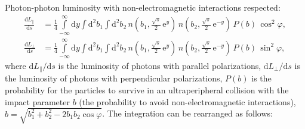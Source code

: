\documentclass[a4paper,12pt]{article}
\begin{document}
Photon-photon luminosity with non-electromagnetic interactions respected:
\begin{equation}
  \begin{aligned}
    \frac{\mathrm{d} L_\parallel}{\mathrm{d} s}
    &= \frac14
       \int\limits_{-\infty}^\infty \mathrm{d} y
       \int\limits \mathrm{d}^2 b_1
       \int\limits \mathrm{d}^2 b_2
       \, n \left( b_1, \tfrac{\sqrt{s}}{2} \, \mathrm{e}^y \right)
       \, n \left( b_2, \tfrac{\sqrt{s}}{2} \, \mathrm{e}^{-y} \right)
       \, P(b)
       \, \cos^2 \varphi,
    \\
    \frac{\mathrm{d} L_\perp}{\mathrm{d} s}
    &= \frac14
       \int\limits_{-\infty}^\infty \mathrm{d} y
       \int\limits \mathrm{d}^2 b_1
       \int\limits \mathrm{d}^2 b_2
       \, n \left( b_1, \tfrac{\sqrt{s}}{2} \, \mathrm{e}^y \right)
       \, n \left( b_2, \tfrac{\sqrt{s}}{2} \, \mathrm{e}^{-y} \right)
       \, P(b)
       \, \sin^2 \varphi,
  \end{aligned}
\end{equation}
where $\mathrm{d} L_\parallel / \mathrm{d} s$ is the luminosity of photons with
parallel polarizations, $\mathrm{d} L_\perp / \mathrm{d} s$ is the luminosity
of photons with perpendicular polarizations, $P(b)$ is the probability for the
particles to survive in an ultraperipheral collision with the impact parameter
$b$ (the probability to avoid non-electromagnetic interactions), $b =
\sqrt{b_1^2 + b_2^2 - 2 b_1 b_2 \cos \varphi}$. The integration can be
rearranged as follows:
\end{document}
